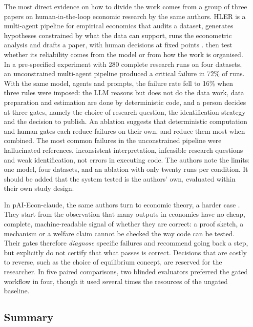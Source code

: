 The most direct evidence on how to divide the work comes from a group of three papers on human-in-the-loop economic research by the same authors.
HLER is a multi-agent pipeline for empirical economics that audits a dataset, generates hypotheses constrained by what the data can support, runs the econometric analysis and drafts a paper, with human decisions at fixed points \citep{zhu2026hler}.
\citet{zhu2026human} then test whether its reliability comes from the model or from how the work is organised.
In a pre-specified experiment with 280 complete research runs on four datasets, an unconstrained multi-agent pipeline produced a critical failure in 72\% of runs.
With the same model, agents and prompts, the failure rate fell to 16\% when three rules were imposed: the LLM reasons but does not do the data work, data preparation and estimation are done by deterministic code, and a person decides at three gates, namely the choice of research question, the identification strategy and the decision to publish.
An ablation suggests that deterministic computation and human gates each reduce failures on their own, and reduce them most when combined.
The most common failures in the unconstrained pipeline were hallucinated references, inconsistent interpretation, infeasible research questions and weak identification, not errors in executing code.
The authors note the limits: one model, four datasets, and an ablation with only twenty runs per condition.
It should be added that the system tested is the authors' own, evaluated within their own study design.

In pAI-Econ-claude, the same authors turn to economic theory, a harder case \citep{zhu2026pai}.
They start from the observation that many outputs in economics have no cheap, complete, machine-readable signal of whether they are correct: a proof sketch, a mechanism or a welfare claim cannot be checked the way code can be tested.
Their gates therefore \emph{diagnose} specific failures and recommend going back a step, but explicitly do not certify that what passes is correct.
Decisions that are costly to reverse, such as the choice of equilibrium concept, are reserved for the researcher.
In five paired comparisons, two blinded evaluators preferred the gated workflow in four, though it used several times the resources of the ungated baseline.

\subsection{Summary}

